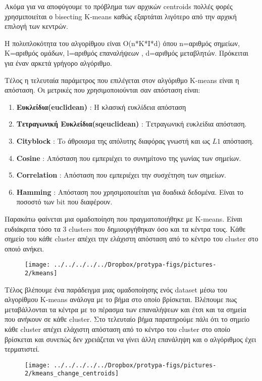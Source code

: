 Ακόμα για να αποφύγουμε το πρόβλημα των αρχικών centroids πολλές φορές χρησμιποιείται ο bisecting K-means καθώς εξαρτάται λιγότερο από την αρχική επιλογή των κεντρών.

Η πολυπλοκότητα του αλγορίθμου είναι Ο(n*K*I*d) όπου n=αριθμός σημείων, Κ=αριθμός ομάδων, l=αριθμός επαναλήψεων , d=αριθμός μεταβλητών. Πρόκειται για έναν αρκετά γρήγορο αλγόριθμο.

Τέλος η τελευταία παράμετρος που επιλέγεται στον αλγόριθμο K-means είναι η απόσταση. Οι μετρικές που χρησιμοποιούνται σαν απόσταση είναι:
\begin{enumerate}
	\item \textbf{Ευκλείδια(euclidean) }: H κλασική ευκλίδεια απόσταση
	\item \textbf{Τετραγωνική Ευκλείδια(sqeuclidean) }: Τετραγωνική ευκλείδια απόσταση.
	\item \textbf{Cityblock }: To άθροισμα της απόλυτης διαφόρας γνωστή και ως $L1$ απόσταση.
	\item \textbf{Cosine }: Απόσταση που εμπεριέχει το συνημίτονο της γωνίας των σημείων.
	\item \textbf{Correlation }: Απόσταση που εμπεριέχει την συσχέτηση των σημείων.
	\item \textbf{Hamming }: Απόσταση που χρησιμοποιείται για δυαδικά δεδομένα. Είναι το ποσοστό των bit που διαφέρουν.
\end{enumerate}

Παρακάτω φαίνεται μια ομαδοποίηση που πραγματοποιήθηκε με K-means. Είναι ευδιάκριτα τόσο τα 3 clusters που δημιουργήθηκαν όσο και τα κέντρα τους. Κάθε σημείο του κάθε cluster απέχει την ελάχιστη απόσταση από το κέντρο του cluster στο οποιό ανήκει.

	\begin{figure}
\centering
\texttt{[image: ../../../../../Dropbox/protypa-figs/pictures-2/kmeans]}
\caption{}
\label{fig:kmeans}
\end{figure}


Τέλος βλέπουμε ένα παράδειγμα μιας ομαδοποίησης ενός dataset μέσω του αλγορίθμου K-means ανάλογα με το βήμα στο οποίο βρίσκεται. Βλέπουμε πως μεταβάλλονται τα κέντρα με το πέρασμα των επαναλήψεων και έτσι και τα σημεία που ανήκουν σε κάθε cluster. Στο τελευταίο βήμα παρατηρούμε πάλι ότι το σημείο κάθε cluster απέχει ελάχιστη απόσταση από το κέντρο του cluster στο οποίο βρίσκεται και συνεπώς δεν χρειάζεται να γίνει άλλη επανάληψη και ο αλγόριθμος έχει τερματιστεί.

\begin{figure}
\centering
\texttt{[image: ../../../../../Dropbox/protypa-figs/pictures-2/kmeans\_change\_centroids]}
\caption{}
\label{fig:kmeans_change_centroids}
\end{figure}



